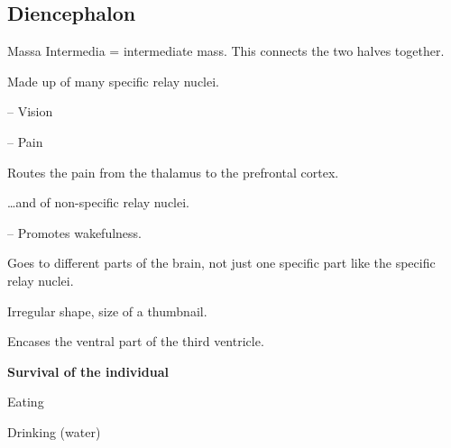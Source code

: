 \subsection{Diencephalon}

\begin{coloredlist}
    \item {}
    \begin{coloredlist}
        \item Massa Intermedia = intermediate mass. This connects the two halves together.
        \item Made up of many specific relay nuclei.
        \begin{coloredlist}
            \item {} -- Vision
            \item {} -- Pain
            \begin{coloredlist}
                \item Routes the pain from the thalamus to the prefrontal cortex.
            \end{coloredlist}
        \end{coloredlist}
        \item \dots and of non-specific relay nuclei.
        \begin{coloredlist}
            \item {} -- Promotes wakefulness.
            \begin{coloredlist}
                \item Goes to different parts of the brain, not just one specific part like the specific relay nuclei.
            \end{coloredlist}
        \end{coloredlist}
    \end{coloredlist}
    \item {}
    \begin{coloredlist}
        \item Irregular shape, size of a thumbnail.
        \item Encases the ventral part of the third ventricle.
        \item \textbf{Survival of the individual}
        \begin{coloredlist}
            \item Eating
            \item Drinking (water)
            \begin{coloredlist}

\end{coloredlist}
\end{coloredlist}
\end{coloredlist}
\end{coloredlist}
